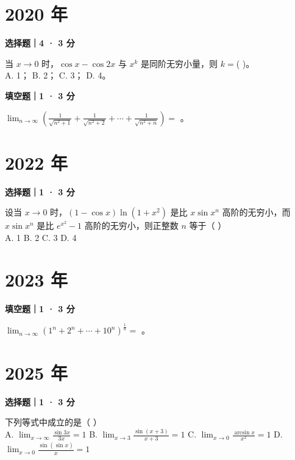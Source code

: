 

\section*{2020 年}


\textbf{选择题｜4 · 3 分}

当 $x \to 0$ 时，$\cos x - \cos 2x$ 与 $x^k$ 是同阶无穷小量，则 $k =$( \quad )。\\
A. 1； \quad B. 2； \quad C. 3； \quad D. 4。


\textbf{填空题｜1 · 3 分}

$\lim_{n\to\infty} \left( \frac{1}{\sqrt{n^2+1}} + \frac{1}{\sqrt{n^2+2}} + \cdots + \frac{1}{\sqrt{n^2+n}} \right) = $ \underline{\hspace{3cm}}。


\section*{2022 年}


\textbf{选择题｜1 · 3 分}

设当 $x \to 0$ 时，$(1-\cos x)\ln(1+x^2)$ 是比 $x\sin x^n$ 高阶的无穷小，而 $x\sin x^n$ 是比 $e^{x^2}-1$ 高阶的无穷小，则正整数 $n$ 等于（ \quad ）\\
A. 1 \quad B. 2 \quad C. 3 \quad D. 4


\section*{2023 年}


\textbf{填空题｜1 · 3 分}

$\lim_{n \to \infty} (1^n + 2^n + \cdots + 10^n)^{\frac{1}{n}} = $ \underline{\hspace{3cm}}。


\section*{2025 年}


\textbf{选择题｜1 · 3 分}

下列等式中成立的是（ \quad ）\\
A. $\lim_{x \to \infty} \frac{\sin 3x}{3x} = 1$ \quad B. $\lim_{x \to 3} \frac{\sin(x+3)}{x+3} = 1$ \quad C. $\lim_{x \to 0} \frac{\arcsin x}{x^2} = 1$ \quad D. $\lim_{x \to 0} \frac{\sin(\sin x)}{x} = 1$
